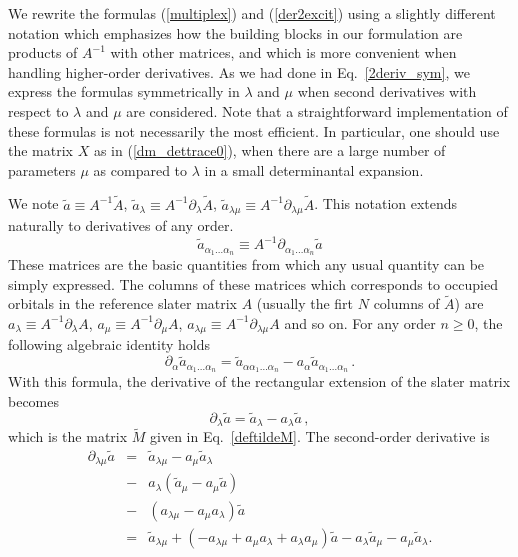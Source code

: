 \documentclass[aip,jcp,reprint,floatfix,onecolumn]{revtex4-1}
\def\l{\alpha_1  \dots \alpha_n}
\begin{document}
We rewrite the formulas (\ref{multiplex}) and (\ref{der2excit}) using a slightly different notation which emphasizes how the building blocks
in our formulation are products of $A^{-1}$ with other matrices, and which is more convenient when handling higher-order derivatives.  As we
had done in Eq.~\ref{2deriv_sym}, we express the formulas symmetrically in $\lambda$ and $\mu$ when second derivatives with respect to $\lambda$ and
$\mu$ are considered.
Note that a straightforward implementation of these formulas is not necessarily the most efficient. In particular,
one should use the matrix $X$ as in (\ref{dm_dettrace0}),  when there are a large number of parameters $\mu$ as compared to $\lambda$ in a small determinantal expansion.

We note $\tilde{a} \equiv A^{-1} \tilde{A}$, $\tilde{a}_\lambda \equiv A^{-1}\partial_\lambda \tilde{A}$, $\tilde{a}_{\lambda \mu} \equiv A^{-1}\partial_{\lambda \mu} \tilde{A}$.  This notation extends naturally to  derivatives of any order.
\begin{equation}
\tilde{a}_{\alpha_1 \dots \alpha_n} \equiv A^{-1} \partial_{\alpha_1 \dots \alpha_n} \tilde{a}
\label{cap2low}
\end{equation}
These  matrices are the basic quantities from which any usual quantity can be simply expressed. The columns of these matrices which corresponds to occupied orbitals in the reference slater matrix $A$ (usually the firt $N$ columns of $\tilde{A}$)  are  ${a}_\lambda\equiv A^{-1}\partial_\lambda A$,  ${a}_\mu \equiv A^{-1} \partial_\mu A$, ${a}_{\lambda \mu} \equiv A^{-1} \partial_{\lambda \mu}A$ and so on.
For  any order $n \geq 0$, the following algebraic identity holds
\begin{equation}
\partial_{\alpha} \tilde{a}_{\l}  =     \tilde{a}_{\alpha \l} -a_\alpha \tilde{a}_{\l}\,.
\label{derc}
\end{equation}
With this formula, the derivative of the rectangular extension of the slater matrix becomes
\begin{equation}
\partial_\lambda \tilde{a} =  \tilde{a}_\lambda -a_\lambda \tilde{a}\,,
\label{der1tilde}
\end{equation}
which is the matrix $\tilde{M}$ given in Eq.~\ref{deftildeM}.
The second-order derivative is
\begin{eqnarray}
\partial_{\lambda \mu} \tilde{a} & =&  \tilde{a}_{\lambda \mu} -a_\mu \tilde{a}_\lambda  \nonumber \\
  &-& a_\lambda (\tilde{a}_\mu -a_\mu \tilde{a}) \nonumber \\
&-&({a_{\lambda \mu}-a_\mu a_\lambda})\tilde{a} \nonumber \\
 & = &  \tilde{a}_{\lambda \mu}+(-{a_{\lambda \mu}+a_\mu a_\lambda+a_\lambda a_\mu})\tilde{a} - a_\lambda \tilde{a}_\mu- a_\mu \tilde{a}_\lambda.
\label{der2tilde}
\end{eqnarray}
\end{document}
